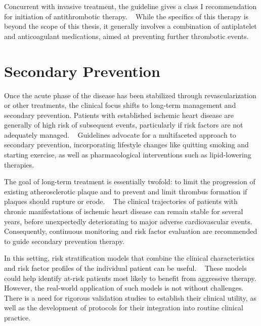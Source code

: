 Concurrent with invasive treatment, 
the guideline gives a class I recommendation for initiation 
of antithrombotic therapy. 
~\autocite{byrne20232023}
While the specifics of this therapy is beyond the scope of this thesis,
it generally involves a combination of antiplatelet and anticoagulant 
medications, aimed at preventing further thrombotic events.
~\autocite{nabelTale2012}

\section{Secondary Prevention}


Once the acute phase of the disease has been stabilized 
through revascularization or other treatments,
the clinical focus shifts to long-term management and secondary prevention.
Patients with established ischemic heart disease are generally of 
high risk of subsequent events, 
particularly if risk factors are not adequately managed.
~\autocite{clarkMetaAnalysis2005}
Guidelines advocate for a multifaceted approach to secondary prevention, 
incorporating lifestyle changes like quitting smoking and starting exercise, 
as well as pharmacological interventions such as lipid-lowering therapies. 
~\autocite{visseren20212021}

The goal of long-term treatment is essentially twofold:
to limit the progression of existing atherosclerotic plaque and 
to prevent and limit thrombus formation if plaques should rupture or erode.
~\autocite{foxMyth2020}
The clinical trajectories of patients with chronic manifestations of 
ischemic heart disease can remain stable for several years,
before unexpectedly deteriorating to 
major adverse cardiovascular events.
~\autocite{foxMyth2020}
Consequently, continuous monitoring and risk factor evaluation 
are recommended to guide secondary prevention therapy.

In this setting,
risk stratification models that combine the clinical characteristics 
and risk factor profiles of the individual patient can be useful.
~\autocite{visseren20212021}
These models could help identify at-risk patients most likely to benefit from 
aggressive therapy. 
However, the real-world application of such models is not without challenges.
There is a need for rigorous validation studies to establish their 
clinical utility, as well as the development of 
protocols for their integration into routine clinical practice.

